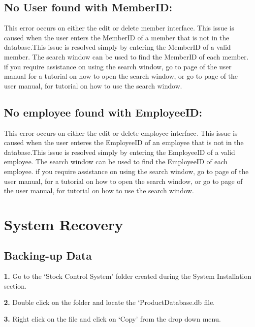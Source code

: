 \subsection{No User found with MemberID:}

This error occurs on either the edit or delete member interface. This issue is caused when the user enters the MemberID of a member that is not in the database.This issue is resolved simply by entering the MemberID of a valid member. The search window can be used to find the MemberID of each member. if you require assistance on using the search window, go to page \pageref{fig:Accessing the search window} of the user manual for a tutorial on how to open the search window, or go to page \pageref{fig:Using the search window} of the user manual, for tutorial on how to use the search window.

\subsection{No employee found with EmployeeID:}

This error occurs on either the edit or delete employee interface. This issue is caused when the user enteres the EmployeeID of an employee that is not in the database.This issue is resolved simply by entering the EmployeeID of a valid employee. The search window can be used to find the EmployeeID of each employee. if you require assistance on using the search window, go to page \pageref{fig:Accessing the search window} of the user manual, for a tutorial on how to open the search window, or go to page \pageref{fig:Using the search window} of the user manual, for tutorial on how to use the search window.



\section{System Recovery}

\subsection{Backing-up Data}

\textbf{1.} Go to the `Stock Control System' folder created during the System Installation section.

\textbf{2.} Double click on the folder and locate the `ProductDatabase.db file.

\textbf{3.} Right click on the file and click on `Copy' from the drop down menu.

